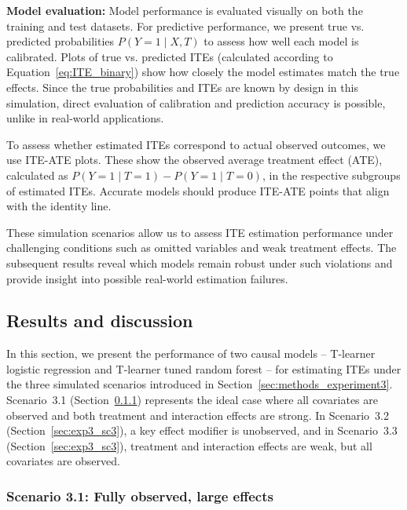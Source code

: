 \medskip

\textbf{Model evaluation:} Model performance is evaluated visually on both the training and test datasets. For predictive performance, we present true vs. predicted probabilities $P(Y = 1 \mid X, T)$ to assess how well each model is calibrated. Plots of true vs. predicted ITEs (calculated according to Equation~\ref{eq:ITE_binary}) show how closely the model estimates match the true effects. Since the true probabilities and ITEs are known by design in this simulation, direct evaluation of calibration and prediction accuracy is possible, unlike in real-world applications.

To assess whether estimated ITEs correspond to actual observed outcomes, we use ITE-ATE plots. These show the observed average treatment effect (ATE), calculated as $P(Y = 1 \mid T = 1) - P(Y = 1 \mid T = 0)$, in the respective subgroups of estimated ITEs. Accurate models should produce ITE-ATE points that align with the identity line.

These simulation scenarios allow us to assess ITE estimation performance under challenging conditions such as omitted variables and weak treatment effects. The subsequent results reveal which models remain robust under such violations and provide insight into possible real-world estimation failures.




\subsection{Results and discussion} \label{sec:results_experiment3}

In this section, we present the performance of two causal models -- T-learner logistic regression and T-learner tuned random forest -- for estimating ITEs under the three simulated scenarios introduced in Section~\ref{sec:methods_experiment3}. Scenario~3.1 (Section~\ref{sec:exp3_sc1}) represents the ideal case where all covariates are observed and both treatment and interaction effects are strong. In Scenario~3.2 (Section~\ref{sec:exp3_sc3}), a key effect modifier is unobserved, and in Scenario~3.3 (Section~\ref{sec:exp3_sc3}), treatment and interaction effects are weak, but all covariates are observed.




\subsubsection{Scenario 3.1: Fully observed, large effects} \label{sec:exp3_sc1}







